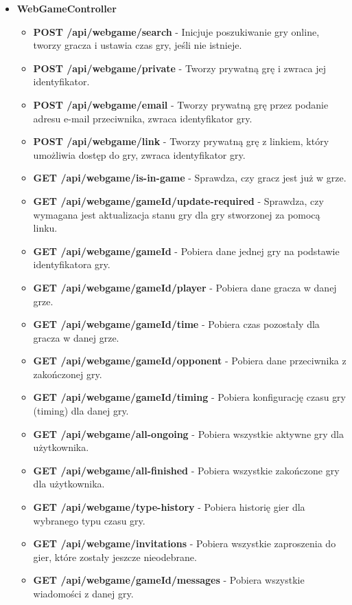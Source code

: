 \documentclass[12pt,a4paper]{article}
\begin{document}
\begin{itemize}
    \newpage

    \item \textbf{WebGameController}
    \begin{itemize} 
        \item \textbf{POST /api/webgame/search} - Inicjuje poszukiwanie gry online, tworzy gracza i ustawia czas gry, jeśli nie istnieje. 
        \item \textbf{POST /api/webgame/private} - Tworzy prywatną grę i zwraca jej identyfikator. 
        \item \textbf{POST /api/webgame/email} - Tworzy prywatną grę przez podanie adresu e-mail przeciwnika, zwraca identyfikator gry. 
        \item \textbf{POST /api/webgame/link} - Tworzy prywatną grę z linkiem, który umożliwia dostęp do gry, zwraca identyfikator gry. 
        \item \textbf{GET /api/webgame/is-in-game} - Sprawdza, czy gracz jest już w grze. 
        \item \textbf{GET /api/webgame/{gameId}/update-required} - Sprawdza, czy wymagana jest aktualizacja stanu gry dla gry stworzonej za pomocą linku. 
        \item \textbf{GET /api/webgame/{gameId}} - Pobiera dane jednej gry na podstawie identyfikatora gry. 
        \item \textbf{GET /api/webgame/{gameId}/player} - Pobiera dane gracza w danej grze. 
        \item \textbf{GET /api/webgame/{gameId}/time} - Pobiera czas pozostały dla gracza w danej grze. 
        \item \textbf{GET /api/webgame/{gameId}/opponent} - Pobiera dane przeciwnika z zakończonej gry. 
        \item \textbf{GET /api/webgame/{gameId}/timing} - Pobiera konfigurację czasu gry (timing) dla danej gry. 
        \item \textbf{GET /api/webgame/all-ongoing} - Pobiera wszystkie aktywne gry dla użytkownika. 
        \item \textbf{GET /api/webgame/all-finished} - Pobiera wszystkie zakończone gry dla użytkownika. 
        \item \textbf{GET /api/webgame/type-history} - Pobiera historię gier dla wybranego typu czasu gry. 
        \item \textbf{GET /api/webgame/invitations} - Pobiera wszystkie zaproszenia do gier, które zostały jeszcze nieodebrane. 
        \item \textbf{GET /api/webgame/{gameId}/messages} - Pobiera wszystkie wiadomości z danej gry. 

\end{itemize}
\end{itemize}
\end{document}
